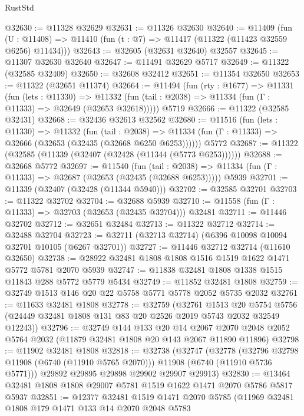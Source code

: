 \begin{lexlean}{RustStd}
\begin{coremodule}
@32630 := @11328 @32629
@32631 := @11326 @32630
@32640 := @11409
    (fun (U : @11408) => @11410 (fun (t : @7) => @11417 (@11322 (@11423 @32559 @6256) @11434)))
@32643 := @32605 (@32631 @32640) @32557
@32645 := @11307 @32630 @32640
@32647 := @11491 @32629 @5717
@32649 := @11322 (@32585 @32409)
@32650 := @32608 @32412
@32651 := @11354 @32650
@32653 := @11322 (@32651 @11374)
@32664 := @11494
    (fun (rty : @1677) =>
    @11331
      (fun (lets : @11330) =>
      @11332 (fun (tail : @2038) => @11334 (fun (Γ : @11333) => @32649 (@32653 @32618)))))
    @5719
@32666 := @11322 (@32585 @32431)
@32668 := @32436 @32613 @32562
@32680 := @11516
    (fun (lets : @11330) =>
    @11332
      (fun (tail : @2038) =>
      @11334 (fun (Γ : @11333) => @32666 (@32653 (@32435 (@32668 @6250 @6253))))))
    @5772
@32687 := @11322 (@32585 (@11339 (@32407 (@32428 (@11344 (@5773 @6253))))))
@32688 := @32668 @5772
@32697 := @11540
    (fun (tail : @2038) => @11334 (fun (Γ : @11333) => @32687 (@32653 (@32435 (@32688 @6253)))))
    @5939
@32701 := @11339 (@32407 (@32428 (@11344 @5940)))
@32702 := @32585 @32701
@32703 := @11322 @32702
@32704 := @32688 @5939
@32710 := @11558 (fun (Γ : @11333) => @32703 (@32653 (@32435 @32704))) @32481
@32711 := @11446 @32702
@32712 := @32651 @32484
@32713 := @11322 @32712
@32714 := @32488 @32704
@32723 := @32711 (@32713 @32714) (@6396 @10098 @10094 @32701 @10105 (@6267 @32701))
@32727 := @11446 @32712 @32714 (@11610 @32650)
@32738 := @28922 @32481 @1808 @1808 @1516 @1519 @1622 @1471 @5772 @5781 @2070 @5939
@32747 := @11838 @32481 @1808 @1338 @1515 @11843 @288 @5772 @5779 @5434
@32749 := @11852 @32481 @1808
@32759 := @32749 @1513 @146 @20 @22 @5758 @5771 @5778 @2052 @5735 @2032
@32761 := @11633 @32481 @1808
@32778 := @32759
    (@32761
      @1513
      @20
      @5754
      @5756
      (@24449 @32481 @1808 @131 @83 @20 @2526 @2019 @5743 @2032 @32549 @12243))
@32796 := @32749
    @144
    @133
    @20
    @14
    @2067
    @2070
    @2048
    @2052
    @5764
    @2032
    (@11879 @32481 @1808 @20 @143 @2067 @11890 @11896)
@32798 := @11902 @32481 @1808
@32818 := @32738
    (@32747
      (@32778
        (@32796 @32798 @11908 (@6740 (@11910 @5765 @2070)))
        @11908
        (@6740 (@11910 @5736 @5771)))
      @29892
      @29895
      @29898
      @29902
      @29907
      @29913)
@32830 := @13464 @32481 @1808 @1808 @29007 @5781 @1519 @1622 @1471 @2070 @5786 @5817 @5937
@32851 := @12377
    @32481
    @1519
    @1471
    @2070
    @5785
    (@11969
      @32481
      @1808
      @179
      @1471
      @133
      @14
      @2070
      @2048
      @5783

\end{coremodule}
\end{lexlean}
